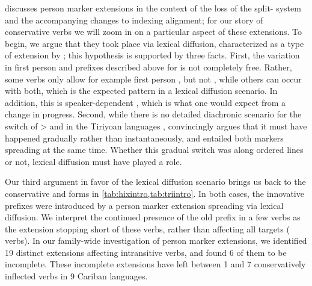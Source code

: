 
\textcite{gildea1998} discusses person marker extensions in the context of the loss of the split- system and the accompanying changes to indexing alignment; for our story of conservative verbs we will zoom in on a particular aspect of these extensions.
To begin, we argue that they took place via lexical diffusion, characterized as a type of extension by \textcite[106--115]{harris1995historical}; this hypothesis is supported by three facts.
First, the variation in first person and  prefixes described above for \kaxui is not completely free.
Rather, some verbs only allow for example first person , but not , while others can occur with both, which is the expected pattern in a lexical diffusion scenario.
In addition, this is speaker-dependent , which is what one would expect from a change in progress.
Second, while there is no detailed diachronic scenario for the switch of >  and  in the Tiriyoan languages , \textcite[111--112]{meira1998proto} convincingly argues that it must have happened gradually rather than instantaneously, and entailed both markers spreading at the same time.
Whether this gradual switch was along ordered lines or not, lexical diffusion must have played a role.

Our third argument in favor of the lexical diffusion scenario brings us back to the conservative \hixka and \trio forms in \cref{tab:hixintro,tab:triintro}.
In both cases, the innovative  prefixes were introduced by a person marker extension spreading via lexical diffusion.
We interpret the continued presence of the old  prefix in a few verbs as the extension stopping short of these verbs, rather than affecting all targets ( verbs).
In our family-wide investigation of person marker extensions, we identified 19 distinct extensions affecting intransitive verbs, and found 6 of them to be incomplete.
These incomplete extensions have left between 1 and 7 conservatively inflected verbs in 9 Cariban languages. %

